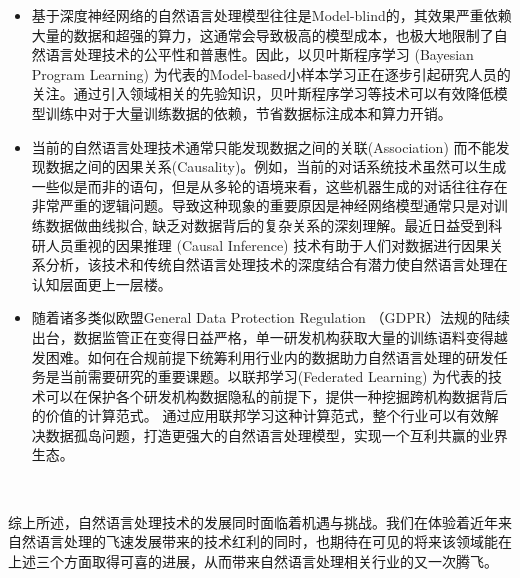 \documentclass[graybox,envcountchap,sectrefs]{svmono}
\begin{document}
\begin{itemize}
  \item 基于深度神经网络的自然语言处理模型往往是Model-blind的，其效果严重依赖大量的数据和超强的算力，这通常会导致极高的模型成本，也极大地限制了自然语言处理技术的公平性和普惠性。因此，以贝叶斯程序学习 (Bayesian Program Learning) \cite{lake2015human}为代表的Model-based小样本学习正在逐步引起研究人员的关注。通过引入领域相关的先验知识，贝叶斯程序学习等技术可以有效降低模型训练中对于大量训练数据的依赖，节省数据标注成本和算力开销。
  \item 当前的自然语言处理技术通常只能发现数据之间的关联(Association) 而不能发现数据之间的因果关系(Causality)。例如，当前的对话系统技术虽然可以生成一些似是而非的语句，但是从多轮的语境来看，这些机器生成的对话往往存在非常严重的逻辑问题。导致这种现象的重要原因是神经网络模型通常只是对训练数据做曲线拟合, 缺乏对数据背后的复杂关系的深刻理解。最近日益受到科研人员重视的因果推理 (Causal Inference) \cite{pearl2010introduction} 技术有助于人们对数据进行因果关系分析，该技术和传统自然语言处理技术的深度结合有潜力使自然语言处理在认知层面更上一层楼。
  \item 随着诸多类似欧盟General Data Protection Regulation （GDPR）法规的陆续出台，数据监管正在变得日益严格，单一研发机构获取大量的训练语料变得越发困难。如何在合规前提下统筹利用行业内的数据助力自然语言处理的研发任务是当前需要研究的重要课题。以联邦学习(Federated Learning) \cite{yang2019federated, jiang2019federated} 为代表的技术可以在保护各个研发机构数据隐私的前提下，提供一种挖掘跨机构数据背后的价值的计算范式。 通过应用联邦学习这种计算范式，整个行业可以有效解决数据孤岛问题，打造更强大的自然语言处理模型，实现一个互利共赢的业界生态。
\end{itemize}


综上所述，自然语言处理技术的发展同时面临着机遇与挑战。我们在体验着近年来自然语言处理的飞速发展带来的技术红利的同时，也期待在可见的将来该领域能在上述三个方面取得可喜的进展，从而带来自然语言处理相关行业的又一次腾飞。






\backmatter%
%
%
\printindex

\end{document}
